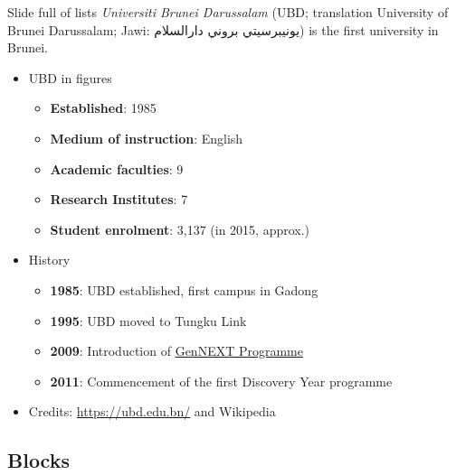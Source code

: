 \documentclass[,aspectratio=43]{beamer}
\providecommand{\tightlist}{%
  \setlength{\itemsep}{0pt}\setlength{\parskip}{0pt}}
\begin{document}
\begin{frame}{Slide full of lists}
\protect\hypertarget{slide-full-of-lists}{}
\emph{Universiti Brunei Darussalam} (UBD; translation University of
Brunei Darussalam; Jawi: \textarabic{يونيبرسيتي بروني دارالسلام}) is the
first university in Brunei.

\begin{itemize}
\tightlist
\item
  UBD in figures

  \begin{itemize}
  \tightlist
  \item
    \textbf{Established}: 1985
  \item
    \textbf{Medium of instruction}: English
  \item
    \textbf{Academic faculties}: 9
  \item
    \textbf{Research Institutes}: 7
  \item
    \textbf{Student enrolment}: 3,137 (in 2015, approx.)
  \end{itemize}
\item
  History

  \begin{itemize}
  \tightlist
  \item
    \textbf{1985}: UBD established, first campus in Gadong
  \item
    \textbf{1995}: UBD moved to Tungku Link
  \item
    \textbf{2009}: Introduction of
    \href{https://ubd.edu.bn/admission/undergraduate/gennext-degree-programme/}{GenNEXT
    Programme}
  \item
    \textbf{2011}: Commencement of the first Discovery Year programme\\
  \end{itemize}
\item
  Credits: \url{https://ubd.edu.bn/} and Wikipedia
\end{itemize}
\end{frame}

\hypertarget{blocks}{%
\subsection{Blocks}\label{blocks}}
\end{document}
